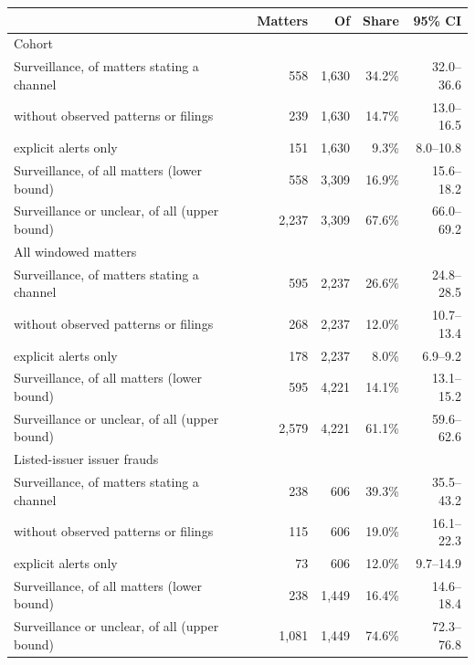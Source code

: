 \begin{tabular*}{\textwidth}[]{l@{\extracolsep\fill}rrrr}
\toprule
 & Matters & Of & Share & 95\% CI\\
\midrule
\multicolumn{5}{l}{Cohort}\\
Surveillance, of matters stating a channel & 558 & 1,630 & 34.2\% & 32.0--36.6\\
\quad without observed patterns or filings & 239 & 1,630 & 14.7\% & 13.0--16.5\\
\quad explicit alerts only & 151 & 1,630 & 9.3\% & 8.0--10.8\\
Surveillance, of all matters (lower bound) & 558 & 3,309 & 16.9\% & 15.6--18.2\\
Surveillance or unclear, of all (upper bound) & 2,237 & 3,309 & 67.6\% & 66.0--69.2\\
\midrule
\multicolumn{5}{l}{All windowed matters}\\
Surveillance, of matters stating a channel & 595 & 2,237 & 26.6\% & 24.8--28.5\\
\quad without observed patterns or filings & 268 & 2,237 & 12.0\% & 10.7--13.4\\
\quad explicit alerts only & 178 & 2,237 & 8.0\% & 6.9--9.2\\
Surveillance, of all matters (lower bound) & 595 & 4,221 & 14.1\% & 13.1--15.2\\
Surveillance or unclear, of all (upper bound) & 2,579 & 4,221 & 61.1\% & 59.6--62.6\\
\midrule
\multicolumn{5}{l}{Listed-issuer issuer frauds}\\
Surveillance, of matters stating a channel & 238 & 606 & 39.3\% & 35.5--43.2\\
\quad without observed patterns or filings & 115 & 606 & 19.0\% & 16.1--22.3\\
\quad explicit alerts only & 73 & 606 & 12.0\% & 9.7--14.9\\
Surveillance, of all matters (lower bound) & 238 & 1,449 & 16.4\% & 14.6--18.4\\
Surveillance or unclear, of all (upper bound) & 1,081 & 1,449 & 74.6\% & 72.3--76.8\\
\bottomrule
\end{tabular*}
